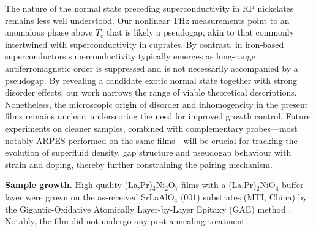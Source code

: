 \documentclass{nature}
\begin{document}
The nature of the normal state preceding superconductivity in RP nickelates remains less well understood. Our nonlinear THz measurements point to an anomalous phase above $T_\mathrm{c}$ that is likely a pseudogap, akin to that commonly intertwined with superconductivity in cuprates. By contrast, in iron‑based superconductors superconductivity typically emerges as long‑range antiferromagnetic order is suppressed and is not necessarily accompanied by a pseudogap. By revealing a candidate exotic normal state together with strong disorder effects, our work narrows the range of viable theoretical descriptions. Nonetheless, the microscopic origin of disorder and inhomogeneity in the present films remains unclear, underscoring the need for improved growth control. Future experiments on cleaner samples, combined with complementary probes—most notably ARPES performed on the same films—will be crucial for tracking the evolution of superfluid density, gap structure and pseudogap behaviour with strain and doping, thereby further constraining the pairing mechanism.


\vspace{18pt}

\textbf{Sample growth.} High-quality (La,Pr)$_3$Ni$_2$O$_{7}$ films with a (La,Pr)$_2$NiO$_{4}$ buffer layer were grown on the as-received SrLaAlO$ _{4} $ (001) substrates (MTI, China) by the Gigantic-Oxidative Atomically Layer-by-Layer Epitaxy (GAE) method \cite{10.1093/nsr/nwae429}. Notably, the film did not undergo any post-annealing treatment.
\end{document}
